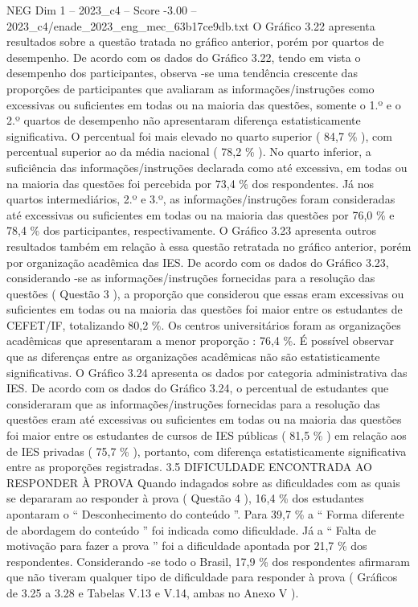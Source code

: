 \begin{textsample}{NEG Dim 1 – 2023\_c4 – Score -3.00 – 2023\_c4/enade\_2023\_eng\_mec\_63b17ce9db.txt}
O Gráfico 3.22 apresenta resultados sobre a questão tratada no gráfico anterior, porém por quartos de desempenho.
De acordo com os dados do Gráfico 3.22, tendo em vista o desempenho dos participantes, observa -se uma tendência crescente das proporções de participantes que avaliaram as informações/instruções como excessivas ou suficientes em todas ou na maioria das questões, somente o 1.º e o 2.º quartos de desempenho não apresentaram diferença estatisticamente significativa.
O percentual foi mais elevado no quarto superior ( 84,7 \% ), com percentual superior ao da média nacional ( 78,2 \% ).
No quarto inferior, a suficiência das informações/instruções declarada como até excessiva, em todas ou na maioria das questões foi percebida por 73,4 \% dos respondentes.
Já nos quartos intermediários, 2.º e 3.º, as informações/instruções foram consideradas até excessivas ou suficientes em todas ou na maioria das questões por 76,0 \% e 78,4 \% dos participantes, respectivamente.
O Gráfico 3.23 apresenta outros resultados também em relação à essa questão retratada no gráfico anterior, porém por organização acadêmica das IES.
De acordo com os dados do Gráfico 3.23, considerando -se as informações/instruções fornecidas para a resolução das questões ( Questão 3 ), a proporção que considerou que essas eram excessivas ou suficientes em todas ou na maioria das questões foi maior entre os estudantes de CEFET/IF, totalizando 80,2 \%.
Os centros universitários foram as organizações acadêmicas que apresentaram a menor proporção : 76,4 \%.
É possível observar que as diferenças entre as organizações acadêmicas não são estatisticamente significativas.
O Gráfico 3.24 apresenta os dados por categoria administrativa das IES.
De acordo com os dados do Gráfico 3.24, o percentual de estudantes que consideraram que as informações/instruções fornecidas para a resolução das questões eram até excessivas ou suficientes em todas ou na maioria das questões foi maior entre os estudantes de cursos de IES públicas ( 81,5 \% ) em relação aos de IES privadas ( 75,7 \% ), portanto, com diferença estatisticamente significativa entre as proporções registradas. 3.5 DIFICULDADE ENCONTRADA AO RESPONDER À PROVA Quando indagados sobre as dificuldades com as quais se depararam ao responder à prova ( Questão 4 ), 16,4 \% dos estudantes apontaram o “ Desconhecimento do conteúdo ”.
Para 39,7 \% a “ Forma diferente de abordagem do conteúdo ” foi indicada como dificuldade.
Já a “ Falta de motivação para fazer a prova ” foi a dificuldade apontada por 21,7 \% dos respondentes.
Considerando -se todo o Brasil, 17,9 \% dos respondentes afirmaram que não tiveram qualquer tipo de dificuldade para responder à prova ( Gráficos de 3.25 a 3.28 e Tabelas V.13 e V.14, ambas no Anexo V ).

\end{textsample}
